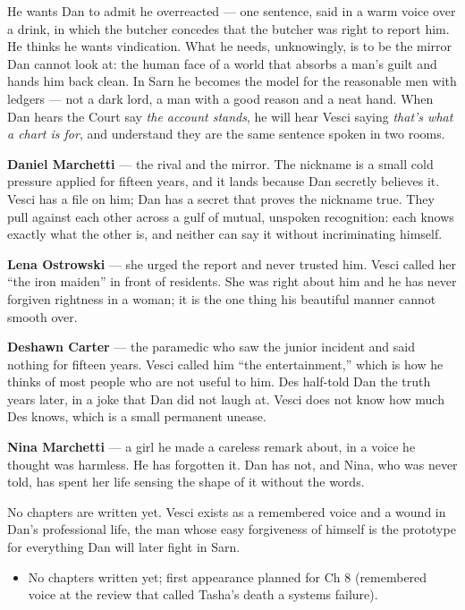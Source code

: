 \documentclass{design/chronicle}
\begin{document}
{
He wants Dan to admit he overreacted — one sentence, said in a warm voice over a drink, in which the butcher concedes that the butcher was right to report him. He thinks he wants vindication. What he needs, unknowingly, is to be the mirror Dan cannot look at: the human face of a world that absorbs a man’s guilt and hands him back clean. In Sarn he becomes the model for the reasonable men with ledgers — not a dark lord, a man with a good reason and a neat hand. When Dan hears the Court say \emph{the account stands}, he will hear Vesci saying \emph{that’s what a chart is for}, and understand they are the same sentence spoken in two rooms.

\textbf{Daniel Marchetti} — the rival and the mirror. The nickname is a small cold pressure applied for fifteen years, and it lands because Dan secretly believes it. Vesci has a file on him; Dan has a secret that proves the nickname true. They pull against each other across a gulf of mutual, unspoken recognition: each knows exactly what the other is, and neither can say it without incriminating himself.

\textbf{Lena Ostrowski} — she urged the report and never trusted him. Vesci called her “the iron maiden” in front of residents. She was right about him and he has never forgiven rightness in a woman; it is the one thing his beautiful manner cannot smooth over.

\textbf{Deshawn Carter} — the paramedic who saw the junior incident and said nothing for fifteen years. Vesci called him “the entertainment,” which is how he thinks of most people who are not useful to him. Des half-told Dan the truth years later, in a joke that Dan did not laugh at. Vesci does not know how much Des knows, which is a small permanent unease.

\textbf{Nina Marchetti} — a girl he made a careless remark about, in a voice he thought was harmless. He has forgotten it. Dan has not, and Nina, who was never told, has spent her life sensing the shape of it without the words.

No chapters are written yet. Vesci exists as a remembered voice and a wound in Dan’s professional life, the man whose easy forgiveness of himself is the prototype for everything Dan will later fight in Sarn.

\begin{itemize}[leftmargin=1.4em,itemsep=1pt,topsep=3pt,parsep=0pt]

\item No chapters written yet; first appearance planned for Ch 8 (remembered voice at the review that called Tasha’s death a systems failure).

\end{itemize}
}
\end{document}
